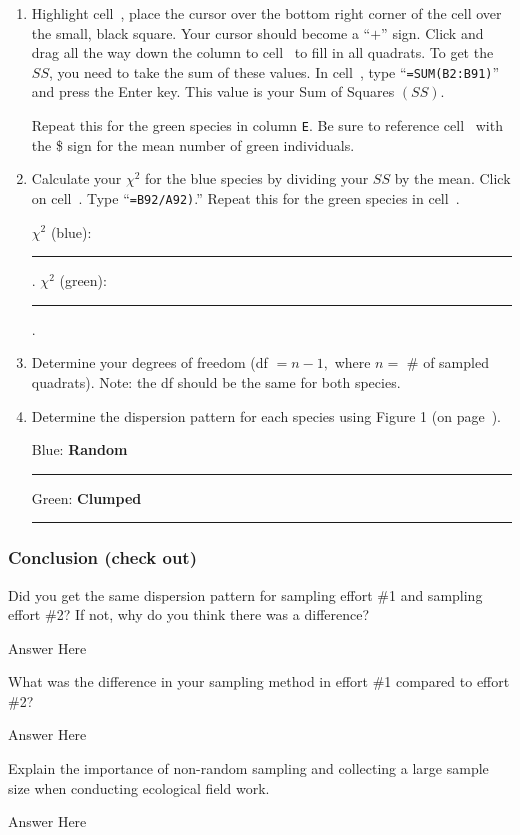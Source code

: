 \documentclass[12pt, hidelinks]{exam}
\newcommand*\AnswerBox[2]{%
    \parbox[t][#1]{0.92\textwidth}{%
    \begin{solution}#2\end{solution}}
    \vspace{\stretch{1}}
}
\newcommand\chisq{$\chi^2$}
\newcommand*\AnswerBlank{\rule{0.75in}{0.4pt}\kern0.67pt.}
\newcommand*\xcell[1]{cell~\liningnum{#1}}
\begin{document}
\begin{questions}
\begin{enumerate}
\item Highlight \xcell{B2}, place the cursor over the bottom right corner of
the cell over the small, black square. Your cursor should become a “$+$”
sign. Click and drag all the way down the column to \xcell{B91} to fill
in all quadrats.  To get the $SS$, you need to take the sum of these
values. In \xcell{B92}, type “\texttt{=SUM(B2:B91)}” and press the Enter key. This value is your Sum of Squares $(SS)$.

Repeat this for the green species in column \texttt{E}. Be sure to reference \xcell{D92} with the \$ sign for the mean number of green individuals.

\item Calculate your \chisq{} for the blue species by dividing your $SS$ by the mean. Click on \xcell{C92}. Type “\texttt{=B92/A92)}.” Repeat this for the green species in \xcell{F92}.

\bigskip

\chisq{} (blue): \AnswerBlank{} \qquad \chisq{} (green): \AnswerBlank{}

\bigskip

\item Determine your degrees of freedom (df $= n-1,$ where $n =$ \# of sampled
quadrats). Note: the df should be the same for both species.

\item Determine the dispersion pattern for each species using Figure 1 (on
page~\pageref{fig:chi_df}).

\bigskip

Blue: \ifprintanswers\textbf{Random}\else\rule{1.5in}{0.4pt}\fi \qquad Green: \ifprintanswers\textbf{Clumped}\else\rule{1.5in}{0.4pt}\fi


\end{enumerate}

\subsubsection*{Conclusion (check out)}

\question
Did you get the same dispersion pattern for sampling effort \#1 and
sampling effort \#2? If not, why do you think there was a difference?

\AnswerBox{3\baselineskip}{%
	Answer Here
}

\question
What was the difference in your sampling method in effort \#1 compared to effort \#2?

\AnswerBox{3\baselineskip}{%
	Answer Here
}

\question
Explain the importance of non-random sampling and collecting a large
sample size when conducting ecological field work.

\AnswerBox{3\baselineskip}{%
	Answer Here
}

\end{questions}
\end{document}
